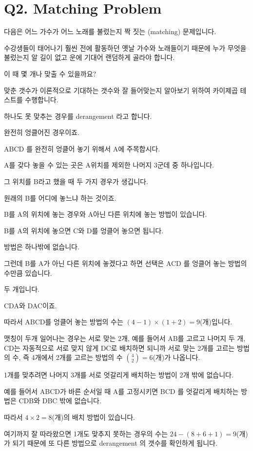 \documentclass[
]{book}
\begin{document}
\section{Q2. Matching Problem}\label{q2.-matching-problem}

다음은 어느 가수가 어느 노래를 불렀는지 짝 짓는 (matching) 문제입니다.

수강생들이 태어나기 훨씬 전에 활동하던 옛날 가수와 노래들이기 때문에 누가 무엇을 불렀는지 알 길이 없고 운에 기대어 랜덤하게 골라야 합니다.

이 때 몇 개나 맞출 수 있을까요?

맞춘 갯수가 이론적으로 기대하는 갯수와 잘 들어맞는지 알아보기 위하여 카이제곱 테스트를 수행합니다.

하나도 못 맞추는 경우를 derangement 라고 합니다.

완전히 엉클어진 경우이죠.

ABCD 를 완전히 엉클어 놓기 위해서 A에 주목합시다.

A를 갖다 놓을 수 있는 곳은 A위치를 제외한 나머지 3군데 중 하나입니다.

그 위치를 B라고 했을 때 두 가지 경우가 생깁니다.

원래의 B를 어디에 놓느냐 하는 것이죠.

B를 A의 위치에 놓는 경우와 A아닌 다른 위치에 놓는 방법이 있습니다.

B를 A의 위치에 놓으면 C와 D를 엉클어 놓으면 됩니다.

방법은 하나밖에 없습니다.

그런데 B를 A가 아닌 다른 위치에 놓겠다고 하면 선택은 ACD 를 엉클어 놓는 방법의 수만큼 있습니다.

두 개입니다.

CDA와 DAC이죠.

따라서 ABCD를 엉클어 놓는 방법의 수는 \((4 - 1)\times(1 + 2) = 9\)(개)입니다.

맷칭이 두개 일어나는 경우는 서로 맞는 2개, 예를 들어서 AB를 고르고 나머지 두 개, CD는 자동적으로 서로 맞지 않게 DC로 배치하면 되니까 서로 맞는 2개를 고르는 방법의 수, 즉 4개에서 2개를 고르는 방법의 수 \(\binom{4}{2} = 6\)(개)가 나옵니다.

1개를 맞추려면 나머지 3개를 서로 엇갈리게 배치하는 방법이 2개 밖에 없습니다.

예를 들어서 ABCD가 바른 순서일 때 A를 고정시키면 BCD 를 엇갈리게 배치하는 방법은 CDB와 DBC 밖에 없습니다.

따라서 \(4\times2 = 8\)(개)의 배치 방법이 있습니다.

여기까지 잘 따라왔으면 1개도 맞추지 못하는 경우의 수는 \(24 - (8 + 6 + 1) = 9\)(개)가 되기 때문에 또 다른 방법으로 derangement 의 갯수를 확인하게 됩니다.
\end{document}
